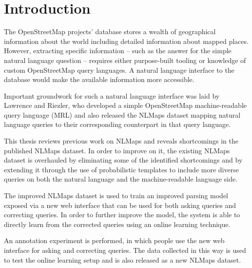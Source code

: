 \chapter{Introduction}
\label{sec:introduction}

The OpenStreetMap projects’ database stores a wealth of geographical information
about the world including detailed information about mapped places. However,
extracting specific information – such as the answer for the simple natural
language question  – requires either purpose-built tooling or knowledge
of custom OpenStreetMap query languages. A natural language interface to the
database would make the available information more accessible.

Important groundwork for such a natural language interface was laid by Lawrence
and Riezler, who developed a simple OpenStreetMap machine-readable query
language (MRL) and also released the NLMaps dataset mapping natural language
queries to their corresponding counterpart in that query language.

This thesis reviews previous work on NLMaps and reveals shortcomings in the
published NLMaps dataset. In order to improve on it, the existing NLMaps dataset
is overhauled by eliminating some of the identified shortcomings and by
extending it through the use of probabilistic templates to include more diverse
queries on both the natural language and the machine-readable language side.

The improved NLMaps dataset is used to train an improved parsing model exposed
via a new web interface that can be used for both asking queries and correcting
queries. In order to further improve the model, the system is able to directly
learn from the corrected queries using an online learning technique.

An annotation experiment is performed, in which people use the new web interface
for asking and correcting queries. The data collected in this way is used to
test the online learning setup and is also released as a new NLMaps dataset.

